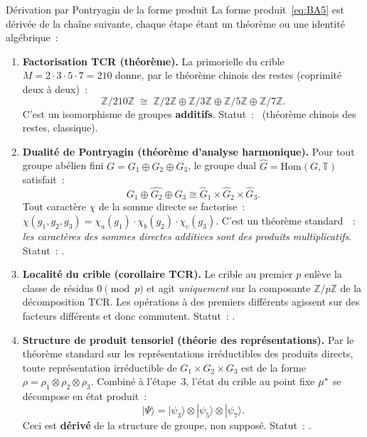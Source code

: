 \documentclass[12pt,a4paper]{article}
\begin{document}
\begin{thmbox}{Dérivation par Pontryagin de la forme produit}
\label{thm:pontryagin}
La forme produit~\eqref{eq:BA5} est dérivée de la chaîne suivante,
chaque étape étant un théorème ou une identité algébrique~:

\begin{enumerate}[leftmargin=*, label=\textbf{Étape \arabic*.}]
\item \textbf{Factorisation TCR (théorème).}
  La primorielle du crible $M = 2 \cdot 3 \cdot 5 \cdot 7 = 210$
  donne, par le théorème chinois des restes (coprimité deux à deux)~:
  \begin{equation}
    \mathbb{Z}/210\mathbb{Z} \;\cong\; \mathbb{Z}/2\mathbb{Z} \oplus
    \mathbb{Z}/3\mathbb{Z} \oplus \mathbb{Z}/5\mathbb{Z} \oplus
    \mathbb{Z}/7\mathbb{Z}.
    \label{eq:CRT_210}
  \end{equation}
  C'est un isomorphisme de groupes \textbf{additifs}. Statut~:
  \THMTAG\ (théorème chinois des restes, classique).

\item \textbf{Dualité de Pontryagin (théorème d'analyse harmonique).}
  Pour tout groupe abélien fini $G = G_1 \oplus G_2 \oplus G_3$, le
  groupe dual $\hat{G} = \mathrm{Hom}(G, \mathbb{T})$ satisfait~:
  \begin{equation}
    \widehat{G_1 \oplus G_2 \oplus G_3} \cong
    \hat{G}_1 \times \hat{G}_2 \times \hat{G}_3.
    \label{eq:pontryagin_factor}
  \end{equation}
  Tout caractère $\chi$ de la somme directe se factorise~:
  $\chi(g_1, g_2, g_3) = \chi_a(g_1) \cdot \chi_b(g_2) \cdot \chi_c(g_3)$.
  C'est un théorème standard~\cite{Rudin1962}~: \emph{les caractères
  des sommes directes additives sont des produits multiplicatifs}.
  Statut~: \THMTAG.

\item \textbf{Localité du crible (corollaire TCR).}
  Le crible au premier $p$ enlève la classe de résidus
  $0 \pmod{p}$ et agit \emph{uniquement} sur la composante
  $\mathbb{Z}/p\mathbb{Z}$ de la décomposition TCR. Les opérations
  à des premiers différents agissent sur des facteurs différents et
  donc commutent. Statut~: \IDTAG.

\item \textbf{Structure de produit tensoriel (théorie des représentations).}
  Par le théorème standard sur les représentations irréductibles des
  produits directs, toute représentation irréductible de
  $G_1 \times G_2 \times G_3$ est de la forme
  $\rho = \rho_1 \otimes \rho_2 \otimes \rho_3$.
  Combiné à l'étape~3, l'état du crible au point fixe ${\mu^{*}}$ se
  décompose en état produit~:
  \begin{equation}
    |\Psi\rangle = |\psi_3\rangle \otimes |\psi_5\rangle
    \otimes |\psi_7\rangle.
    \label{eq:product_state}
  \end{equation}
  Ceci est \textbf{dérivé} de la structure de groupe, non supposé.
  Statut~: \THMTAG.


\end{enumerate}
\end{thmbox}
\end{document}
